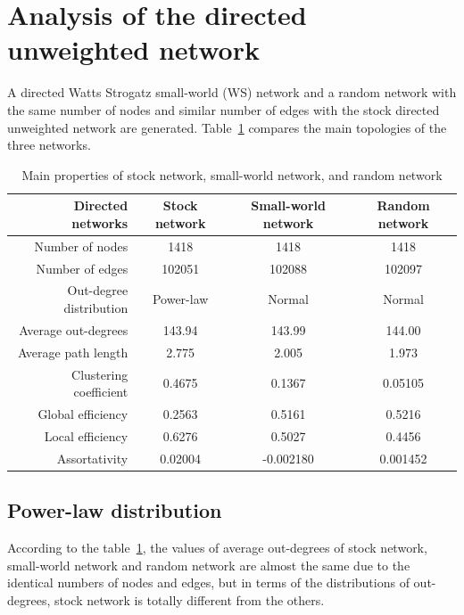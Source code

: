 
\section{Analysis of the directed unweighted network}
A directed Watts Strogatz small-world (WS) network and a random network with the same number of nodes and similar number of edges with the stock directed unweighted network are generated. Table~\ref{tab:three} compares the main topologies of the three networks.

\begin{table}
	\begin{center}
		\begin{tabular}{|r|c|c|c|}\hline\hline
			Directed networks&Stock network&Small-world network&Random network\\\hline
			Number of nodes&1418&1418&1418\\
			Number of edges&102051&102088&102097\\
			Out-degree distribution&Power-law&Normal&Normal\\
			Average out-degrees&143.94&143.99&144.00\\
			Average path length&2.775&2.005&1.973\\
			Clustering coefficient&0.4675&0.1367&0.05105\\
			Global efficiency&0.2563&0.5161&0.5216\\
			Local efficiency&0.6276&0.5027&0.4456\\
			Assortativity&0.02004&-0.002180&0.001452\\
			\hline\hline
		\end{tabular}
	\end{center}
	\caption{Main properties of stock network, small-world network, and random network}\label{tab:three}
\end{table}

\subsection{Power-law distribution}

According to the table~\ref{tab:three}, the values of average out-degrees of stock network, small-world network and random network are almost the same due to the identical numbers of nodes and edges, but in terms of the distributions of out-degrees, stock network is totally different from the others. 

